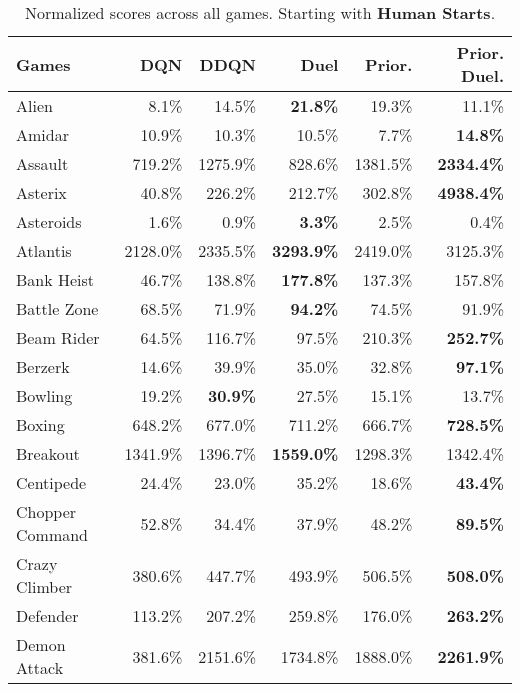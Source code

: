 \begin{table}[t]
\caption{Normalized scores across all games. Starting with {\bf Human Starts}.}
\footnotesize
\begin{center}
\begin{tabular}{l|rrr|rr}
              {\sc Games} &   {\sc DQN} &       {\sc DDQN} &       {\sc Duel} &{\sc Prior.} & {\sc Prior. Duel.} \\
\hline 
               Alien &     8.1\% &    14.5\% &{\bf21.8\%}&    19.3\% &      11.1\% \\
              Amidar &    10.9\% &    10.3\% &    10.5\% &     7.7\% &{\bf14.8\%}\\
             Assault &   719.2\% &  1275.9\% &   828.6\% &  1381.5\% &{\bf2334.4\%}\\
             Asterix &    40.8\% &   226.2\% &   212.7\% &   302.8\% &{\bf4938.4\%}\\
           Asteroids &     1.6\% &     0.9\% &{\bf3.3\%}&     2.5\% &       0.4\% \\
            Atlantis &  2128.0\% &  2335.5\% &{\bf3293.9\%}&  2419.0\% &    3125.3\% \\
          Bank Heist &    46.7\% &   138.8\% &{\bf177.8\%}&   137.3\% &     157.8\% \\
         Battle Zone &    68.5\% &    71.9\% &{\bf94.2\%}&    74.5\% &      91.9\% \\
          Beam Rider &    64.5\% &   116.7\% &    97.5\% &   210.3\% &{\bf252.7\%}\\
             Berzerk &    14.6\% &    39.9\% &    35.0\% &    32.8\% &{\bf97.1\%}\\
             Bowling &    19.2\% &{\bf30.9\%}&    27.5\% &    15.1\% &      13.7\% \\
              Boxing &   648.2\% &   677.0\% &   711.2\% &   666.7\% &{\bf728.5\%}\\
            Breakout &  1341.9\% &  1396.7\% &{\bf1559.0\%}&  1298.3\% &    1342.4\% \\
           Centipede &    24.4\% &    23.0\% &    35.2\% &    18.6\% &{\bf43.4\%}\\
     Chopper Command &    52.8\% &    34.4\% &    37.9\% &    48.2\% &{\bf89.5\%}\\
       Crazy Climber &   380.6\% &   447.7\% &   493.9\% &   506.5\% &{\bf508.0\%}\\
            Defender &   113.2\% &   207.2\% &   259.8\% &   176.0\% &{\bf263.2\%}\\
        Demon Attack &   381.6\% &  2151.6\% &  1734.8\% &  1888.0\% &{\bf2261.9\%}\\

\end{tabular}
\end{center}
\end{table}
